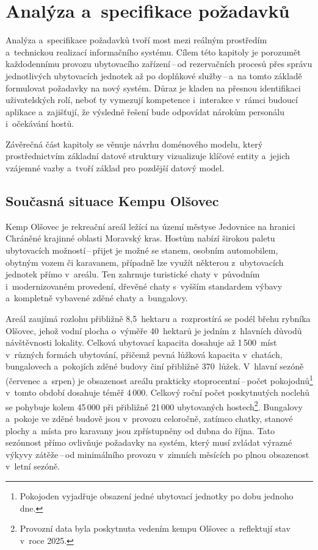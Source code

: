 \chapter{Analýza a~specifikace požadavků}
\label{ch:analyse}
Analýza a~specifikace požadavků tvoří most mezi reálným prostředím a~technickou realizací informačního systému.
Cílem této kapitoly je porozumět každodennímu provozu ubytovacího zařízení\,--\,od rezervačních procesů přes správu jednotlivých ubytovacích jednotek až po doplňkové služby\,--\,a~na tomto základě formulovat požadavky na nový systém.
Důraz je kladen na přesnou identifikaci uživatelských rolí, neboť ty vymezují kompetence i~interakce v~rámci budoucí aplikace a~zajišťují, že výsledné řešení bude odpovídat nárokům personálu i~očekávání hostů.

Závěrečná část kapitoly se věnuje návrhu doménového modelu, který prostřednictvím základní datové struktury vizualizuje klíčové entity a~jejich vzájemné vazby a~tvoří základ pro pozdější datový model.

\section{Současná situace Kempu Olšovec}
Kemp Olšovec je rekreační areál ležící na území městyse Jedovnice na hranici Chráněné krajinné oblasti Moravský kras.
Hostům nabízí širokou paletu ubytovacích možností\,--\,přijet je možné se stanem, osobním automobilem, obytným vozem či karavanem, případně lze využít některou z~ubytovacích jednotek přímo v~areálu.
Ten zahrnuje turistické chaty v~původním i~modernizovaném provedení, dřevěné chaty s~vyšším standardem výbavy a~kompletně vybavené zděné chaty a~bungalovy.

Areál zaujímá rozlohu přibližně 8{,}5~hektaru a~rozprostírá se podél břehu rybníka Olšovec, jehož vodní plocha o~výměře 40~hektarů je jedním z~hlavních důvodů návštěvnosti lokality.
Celková ubytovací kapacita dosahuje až 1\,500~míst v~různých formách ubytování, přičemž pevná lůžková kapacita v~chatách, bungalovech a~pokojích zděné budovy činí přibližně 370~lůžek.
V~hlavní sezóně (červenec a~srpen) je obsazenost areálu prakticky stoprocentní\,--\,počet pokojodnů\footnote{Pokojoden vyjadřuje obsazení jedné ubytovací jednotky po dobu jednoho dne.} v~tomto období dosahuje téměř 4\,000.
Celkový roční počet poskytnutých noclehů se pohybuje kolem 45\,000 při přibližně 21\,000 ubytovaných hostech\footnote{Provozní data byla poskytnuta vedením kempu Olšovec a~reflektují stav v~roce 2025.}.
Bungalovy a~pokoje ve zděné budově jsou v~provozu celoročně, zatímco chatky, stanové plochy a~místa pro karavany jsou zpřístupněny od dubna do října.
Tato sezónnost přímo ovlivňuje požadavky na systém, který musí zvládat výrazné výkyvy zátěže\,--\,od minimálního provozu v~zimních měsících po plnou obsazenost v~letní sezóně.


